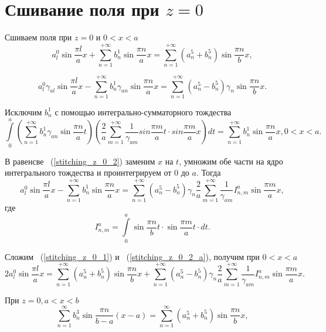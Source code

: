 \section{Сшивание поля при $z=0$}

Сшиваем поля при $z = 0$ и $0 < x < a$
\begin{equation}
	\label{stitching_z_0_1}
	a_l^0\sin{\frac{\pi l}{a}x} + \sum\limits_{n=1}^{+\infty}b_n^1\sin{\frac{\pi n}{a}x} = \sum\limits_{n=1}^{+\infty}\left(a_n^5+b_n^5\right)\sin{\frac{\pi n}{b}x},
\end{equation}

\begin{equation}
	\label{stitching_z_0_2}
	a_l^0\gamma_{al}\sin{\frac{\pi l}{a}x} - \sum\limits_{n=1}^{+\infty}b_n^1\gamma_{an}\sin{\frac{\pi n}{a}x} = \sum\limits_{n=1}^{+\infty}\left(a_n^5-b_n^5\right)\gamma_{n}\sin{\frac{\pi n}{b}x}.
\end{equation}

Исключим $b_n^1$ с помощью интегрально-сумматорного тождества
$$
	\int\limits_0^a\left(\sum\limits_{n=1}^{+\infty}b_n^1\gamma_{an}\sin{\frac{\pi n}{a}t}\right)\left(\frac{2}{a}\sum\limits_{m=1}^{+\infty}\frac{1}{\gamma_{am}}sin{\frac{\pi m}{a}t} \cdot sin{\frac{\pi m}{a}x}\right)dt = \sum\limits_{n=1}^{+\infty}b_n^1\sin{\frac{\pi n}{a}x}, 0 < x < a.
$$

В равенсве ~(\ref{stitching_z_0_2}) заменим $x$ на $t$, умножим обе части на ядро интегрального тождества и проинтегрируем от $0$ до $a$. Тогда
\begin{equation}
	\label{stitching_z_0_2_a}
	a_l^0\sin{\frac{\pi l}{a}x}-\sum\limits_{n=1}^{+\infty}b_n^1\sin{\frac{\pi n}{a}x} = \sum\limits_{n=1}^{+\infty}\left(a_n^5-b_n^5\right)\gamma_{n}\frac{2}{a}\sum\limits_{m=1}^{+\infty}\frac{1}{\gamma_{am}}I_{n,m}^a\sin{\frac{\pi m}{a}x},
\end{equation}
где
$$
	I_{n,m}^a = \int\limits_0^a\sin{\frac{\pi n}{b}t} \cdot \sin{\frac{\pi m}{a}t} \cdot dt.
$$

Сложим ~(\ref{stitching_z_0_1}) и ~(\ref{stitching_z_0_2_a}), получим при $0 < x < a$
\begin{equation}
	\label{stitching_z_0_3}
	2a_l^0\sin{\frac{\pi l}{a}x} = \sum\limits_{n=1}^{+\infty}\left(a_n^5+b_n^5\right)\sin{\frac{\pi n}{b}x} + \sum\limits_{n=1}^{+\infty}\left(a_n^5-b_n^5\right)\gamma_{n}\frac{2}{a}\sum\limits_{m=1}^{+\infty}\frac{1}{\gamma_{am}}I_{n,m}^a\sin{\frac{\pi m}{a}x}.
\end{equation}

При $z = 0, a < x < b$
\begin{equation}
	\label{stitching_z_0_4}
	\sum\limits_{n=1}^{\infty}b_n^3\sin{\frac{\pi n}{b-a}(x-a)} = \sum\limits_{n=1}^{\infty}\left(a_n^5+b_n^5\right)\sin{\frac{\pi n}{b}x},	
\end{equation}

